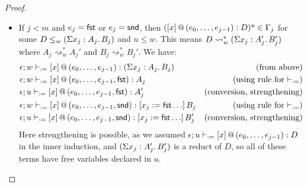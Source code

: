 \documentclass[twoside]{report}
\begin{document}
\begin{proof}
\begin{itemize}
\begin{itemize}
                  \item If $j < m$ and $e_j = \operatorname{\mathsf{fst}}$ or $e_j = \operatorname{\mathsf{snd}}$, then $({[x]}\,@\,({e_0, \ldots, e_{j-1}}) : D)^u \in \Gamma_j$ for some $D \leq_w (\Sigma{x_j} : {A_j}.\,{B_j})$ and $u \leq w$. This means $D \rightsquigarrow^\ast_w (\Sigma{x_j} : {A_j'}.\,{B_j'})$ where $A_j \rightsquigarrow^\ast_w A_j'$ and $B_j \rightsquigarrow^\ast_w B_j'$. We have:
                        $$
                            \begin{aligned}
                            & \epsilon; w \vdash_{:=} {[x]}\,@\,({e_0, \ldots, e_{j-1}}) : (\Sigma{x_j} : {A_j}.\,{B_j}) & \text{(from above)} \\
                            & \epsilon; w \vdash_{:=} {[x]}\,@\,({e_0, \ldots, e_{j-1}, \operatorname{\mathsf{fst}}}) : A_j & \text{(using rule for $\vdash_{:=}$)} \\
                            & \epsilon; u \vdash_{:=} {[x]}\,@\,({e_0, \ldots, e_{j-1}, \operatorname{\mathsf{fst}}}) : A_j' & \text{(conversion, strengthening)} \\
                            & \epsilon; w \vdash_{:=} {[x]}\,@\,({e_0, \ldots, e_{j-1}, \operatorname{\mathsf{snd}}}) : [{x_j}:={\operatorname{\mathsf{fst}} \ldots}]\,{B_j} & \text{(using rule for $\vdash_{:=}$)} \\
                            & \epsilon; u \vdash_{:=} {[x]}\,@\,({e_0, \ldots, e_{j-1}, \operatorname{\mathsf{snd}}}) : [{x_j}:={\operatorname{\mathsf{fst}} \ldots}]\,{B_j'} & \text{(conversion, strengthening)} \\
                            \end{aligned}
                        $$
                        Here strengthening is possible, as we assumed $\epsilon; u \vdash_{:=} {[x]}\,@\,({e_0, \ldots, e_{j-1}}) : D$ in the inner induction, and $(\Sigma{x_j} : {A_j'}.\,{B_j'})$ is a reduct of $D$, so all of these terms have free variables declared in $u$.


\end{itemize}
\end{itemize}
\end{proof}
\end{document}
